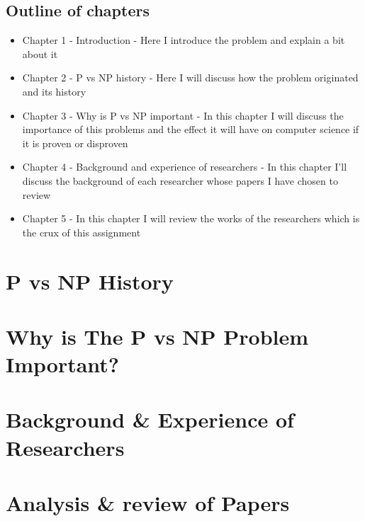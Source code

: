 \documentclass{report}
\begin{document}
\section{Outline of chapters}
\begin{itemize}
  \item Chapter 1 - Introduction - Here I introduce the problem and explain a bit
  about it
  \item  Chapter 2 - P vs NP history - Here I will discuss how the problem originated and its history
  \item Chapter 3 - Why is P vs NP important - In this chapter I will discuss the importance of this problems
  and the effect it will have on computer science if it is proven or disproven
  \item Chapter 4 - Background and experience of researchers - In this chapter I'll discuss the background of
  each researcher whose papers I have chosen to review
  \item Chapter 5 - In this chapter I will review the works of the researchers which is the crux of this assignment
\end{itemize}
\chapter{P vs NP History}
\chapter{Why is The P vs NP Problem Important?}
\chapter{Background \& Experience of Researchers}
\chapter{Analysis \& review of Papers}



\end{document}
